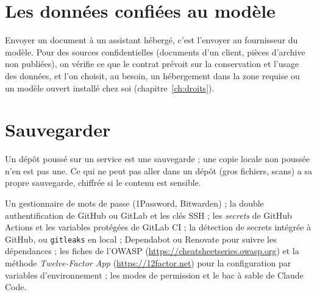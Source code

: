 \section{Les données confiées au modèle}

Envoyer un document à un assistant hébergé, c'est l'envoyer au fournisseur du modèle. Pour
des sources confidentielles (documents d'un client, pièces d'archive non publiées), on
vérifie ce que le contrat prévoit sur la conservation et l'usage des données, et l'on
choisit, au besoin, un hébergement dans la zone requise ou un modèle ouvert installé chez
soi (chapitre~\ref{ch:droits}).

\section{Sauvegarder}

Un dépôt poussé sur un service est une sauvegarde ; une copie locale non poussée n'en est
pas une. Ce qui ne peut pas aller dans un dépôt (gros fichiers, scans) a sa propre
sauvegarde, chiffrée si le contenu est sensible.

\begin{outils}
Un gestionnaire de mots de passe (1Password, Bitwarden) ; la double authentification de
GitHub ou GitLab et les clés SSH ; les \emph{secrets} de GitHub Actions et les variables
protégées de GitLab CI ; la détection de secrets intégrée à GitHub, ou \texttt{gitleaks}
en local ; Dependabot ou Renovate pour suivre les dépendances ; les fiches de l'OWASP
(\url{https://cheatsheetseries.owasp.org}) et la méthode \emph{Twelve-Factor App}
(\url{https://12factor.net}) pour la configuration par variables d'environnement ; les
modes de permission et le bac à sable de Claude Code.
\end{outils}
